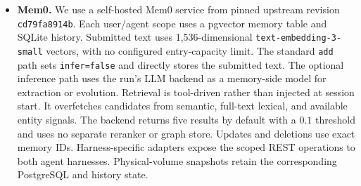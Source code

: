 \documentclass[letterpaper]{article}
\begin{document}
\begin{itemize}
    \item \textbf{Mem0.} We use a self-hosted Mem0 service from pinned upstream revision \texttt{cd79fa8914b}. Each user/agent scope uses a pgvector memory table and SQLite history. Submitted text uses 1,536-dimensional \texttt{text-embedding-3-small} vectors, with no configured entry-capacity limit. The standard \texttt{add} path sets \texttt{infer=false} and directly stores the submitted text. The optional inference path uses the run's LLM backend as a memory-side model for extraction or evolution. Retrieval is tool-driven rather than injected at session start. It overfetches candidates from semantic, full-text lexical, and available entity signals. The backend returns five results by default with a \(0.1\) threshold and uses no separate reranker or graph store. Updates and deletions use exact memory IDs. Harness-specific adapters expose the scoped REST operations to both agent harnesses. Physical-volume snapshots retain the corresponding PostgreSQL and history state.


\end{itemize}
\end{document}
